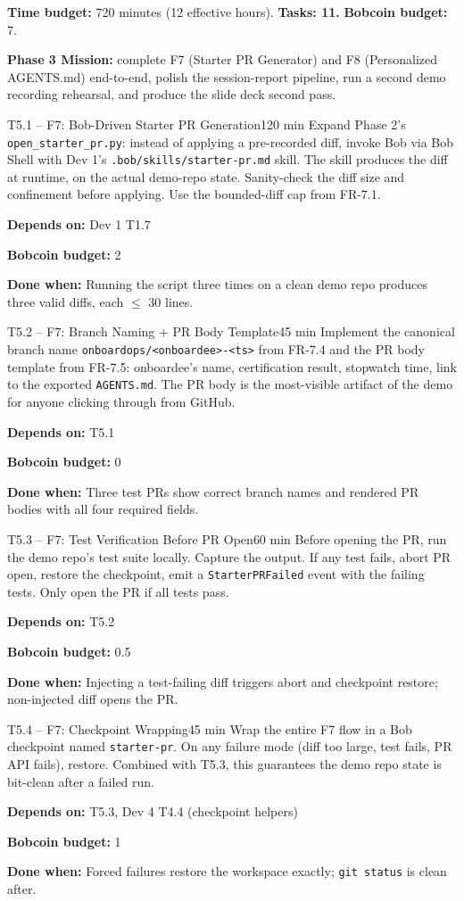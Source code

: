 \documentclass[11pt,letterpaper]{article}
\newcommand{\acceptance}[1]{\par\smallskip\textcolor{ibmgreen}{\textbf{Done when:}} #1}
\newcommand{\depends}[1]{\par\smallskip\textcolor{ibmorange}{\textbf{Depends on:}} #1}
\newcommand{\bobcost}[1]{\par\smallskip\textcolor{ibmaccent}{\textbf{Bobcoin budget:}} #1}
\begin{document}
\textbf{Time budget:} 720 minutes (12 effective hours). \textbf{Tasks: 11.} \textbf{Bobcoin budget:} 7.

\textbf{Phase 3 Mission:} complete F7 (Starter PR Generator) and F8 (Personalized AGENTS.md) end-to-end, polish the session-report pipeline, run a second demo recording rehearsal, and produce the slide deck second pass.

\begin{task}{T5.1 -- F7: Bob-Driven Starter PR Generation}{120 min}
Expand Phase 2's \texttt{open\_starter\_pr.py}: instead of applying a pre-recorded diff, invoke Bob via Bob Shell with Dev 1's \texttt{.bob/skills/starter-pr.md} skill. The skill produces the diff at runtime, on the actual demo-repo state. Sanity-check the diff size and confinement before applying. Use the bounded-diff cap from FR-7.1.
\depends{Dev 1 T1.7}
\bobcost{2}
\acceptance{Running the script three times on a clean demo repo produces three valid diffs, each $\leq$ 30 lines.}
\end{task}

\begin{task}{T5.2 -- F7: Branch Naming + PR Body Template}{45 min}
Implement the canonical branch name \texttt{onboardops/<onboardee>-<ts>} from FR-7.4 and the PR body template from FR-7.5: onboardee's name, certification result, stopwatch time, link to the exported \texttt{AGENTS.md}. The PR body is the most-visible artifact of the demo for anyone clicking through from GitHub.
\depends{T5.1}
\bobcost{0}
\acceptance{Three test PRs show correct branch names and rendered PR bodies with all four required fields.}
\end{task}

\begin{task}{T5.3 -- F7: Test Verification Before PR Open}{60 min}
Before opening the PR, run the demo repo's test suite locally. Capture the output. If any test fails, abort PR open, restore the checkpoint, emit a \texttt{StarterPRFailed} event with the failing tests. Only open the PR if all tests pass.
\depends{T5.2}
\bobcost{0.5}
\acceptance{Injecting a test-failing diff triggers abort and checkpoint restore; non-injected diff opens the PR.}
\end{task}

\begin{task}{T5.4 -- F7: Checkpoint Wrapping}{45 min}
Wrap the entire F7 flow in a Bob checkpoint named \texttt{starter-pr}. On any failure mode (diff too large, test fails, PR API fails), restore. Combined with T5.3, this guarantees the demo repo state is bit-clean after a failed run.
\depends{T5.3, Dev 4 T4.4 (checkpoint helpers)}
\bobcost{1}
\acceptance{Forced failures restore the workspace exactly; \texttt{git status} is clean after.}
\end{task}
\end{document}
